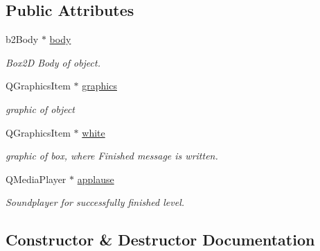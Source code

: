 \subsection*{Public Attributes}
\begin{DoxyCompactItemize}
\item 
b2\+Body $\ast$ \hyperlink{class_mein_element_a05117e05589fc0a4b1e144511fbd3eec}{body}
\begin{DoxyCompactList}\small\item\em Box2D Body of object. \end{DoxyCompactList}\item 
Q\+Graphics\+Item $\ast$ \hyperlink{class_mein_element_a6d0a318f2e37f3633f7cf6fc20e83531}{graphics}
\begin{DoxyCompactList}\small\item\em graphic of object \end{DoxyCompactList}\item 
Q\+Graphics\+Item $\ast$ \hyperlink{class_mein_element_a4811ea6a6c50dfad16c39bbaa9a758b8}{white}
\begin{DoxyCompactList}\small\item\em graphic of box, where \textquotesingle{}Finished\textquotesingle{} message is written. \end{DoxyCompactList}\item 
Q\+Media\+Player $\ast$ \hyperlink{class_mein_element_a04019be8ecb452cf4ee984efed24e9e1}{applause}
\begin{DoxyCompactList}\small\item\em Soundplayer for successfully finished level. \end{DoxyCompactList}\end{DoxyCompactItemize}


\subsection{Constructor \& Destructor Documentation}
